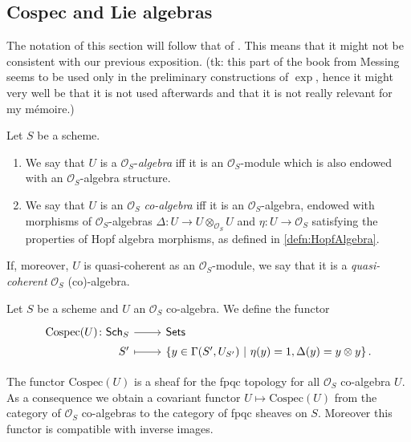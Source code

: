 \documentclass[../Main]{subfiles}
\begin{document}
\subsection{Cospec and Lie algebras}
The notation of this section will follow that of \cite[Capther III]{Messing}.
This means that it might not be consistent with our previous exposition.
(tk: this part of the book from Messing seems to be used only in the preliminary
constructions of $\exp$, hence it might very well be that it is not used afterwards
and that it is not really relevant for my m\'emoire.)


\begin{defn}
	Let $S$ be a scheme.
\begin{enumerate}
\item We say that $U$ is a $\mathcal{O}_{ S }$-{\em algebra}
	iff it is an $\mathcal{O}_{ S }$-module
	which is also endowed with an $\mathcal{O}_{ S }$-algebra structure.
\item We say that $U$ is an $\mathcal{O}_{ S }$ {\em co-algebra}
	iff it is an $\mathcal{O}_{ S }$-algebra, endowed with
	morphisms of $\mathcal{O}_S$-algebras
	$\Delta\colon U \to U \otimes_{\mathcal{O}_{ S }} U$
	and $\eta\colon U \to \mathcal{O}_{ S }$
	satisfying the properties of Hopf algebra morphisms,
	as defined in \cref{defn:HopfAlgebra}.
\end{enumerate}
	If, moreover, $U$ is quasi-coherent as an $\mathcal{O}_{ S }$-module,
	we say that it is a {\em quasi-coherent} $\mathcal{O}_{ S }$ (co)-algebra.
\end{defn}


\begin{defn}[]
	Let $S$ be a scheme and $U$ an $\mathcal{O}_{ S }$ co-algebra.
	We define the functor 
	\begin{equation*}
	\begin{tikzcd}[row sep = 0ex
		,/tikz/column 1/.append style={anchor=base east}
		,/tikz/column 2/.append style={anchor=base west}]
		\mathrm{Cospec}(U)\colon 
		\mathsf{Sch}_{ S }\arrow[r, "", rightarrow] &
		\mathsf{Sets} \\
		S' \arrow[r, "", mapsto] & 
		\left\{ y \in \Gamma(S', U_{S'}) \ \middle|\ 
		\eta(y) = 1, \Delta(y) = y \otimes y\right\}
	.\end{tikzcd}
	\end{equation*} 
\end{defn}


\begin{rem}
	The functor $\mathrm{Cospec}(U)$ is a sheaf for the fpqc topology
	for all $\mathcal{O}_{ S }$ co-algebra $U$.
	As a consequence we obtain a covariant functor $U \mapsto \mathrm{Cospec}(U)$
	from the category of $\mathcal{O}_{ S }$ co-algebras to the category
	of fpqc sheaves on $S$.
	Moreover this functor is compatible with inverse images.
\end{rem}
\end{document}
